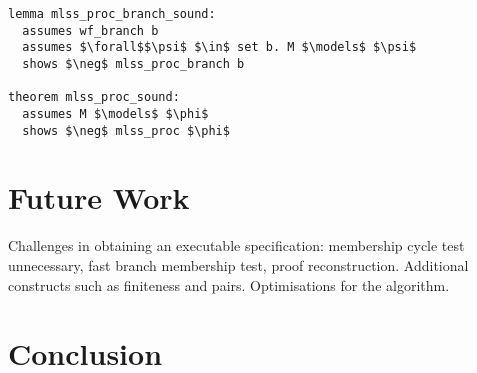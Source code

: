 \documentclass[sigplan,10pt,anonymous,review]{acmart}
\begin{document}
\begin{lstlisting}
lemma mlss_proc_branch_sound:
  assumes wf_branch b
  assumes $\forall$$\psi$ $\in$ set b. M $\models$ $\psi$
  shows $\neg$ mlss_proc_branch b

theorem mlss_proc_sound:
  assumes M $\models$ $\phi$
  shows $\neg$ mlss_proc $\phi$
\end{lstlisting}

\section{Future Work}
Challenges in obtaining an executable specification: membership cycle test unnecessary, fast branch membership test, proof reconstruction.
Additional constructs such as finiteness and pairs.
Optimisations for the algorithm.

\section{Conclusion}

\begin{acks}
\end{acks}



\end{document}
